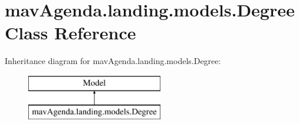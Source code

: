 \hypertarget{classmavAgenda_1_1landing_1_1models_1_1Degree}{}\section{mav\+Agenda.\+landing.\+models.\+Degree Class Reference}
\label{classmavAgenda_1_1landing_1_1models_1_1Degree}
Inheritance diagram for mav\+Agenda.\+landing.\+models.\+Degree\+:\begin{figure}[H]
\begin{center}
\leavevmode
\includegraphics[height=2.000000cm]{classmavAgenda_1_1landing_1_1models_1_1Degree}
\end{center}
\end{figure}
